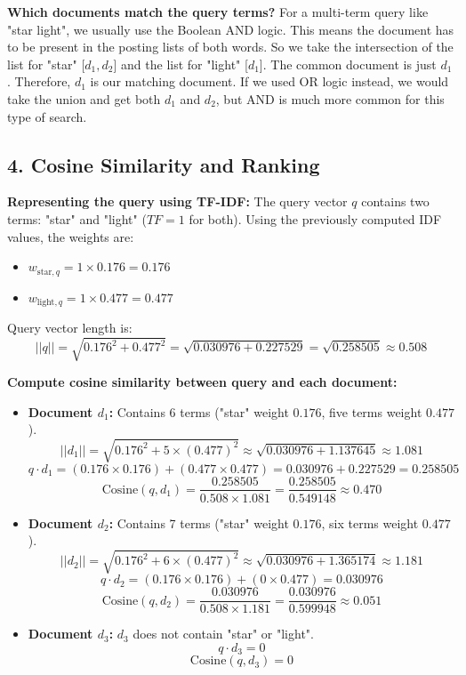 \documentclass{svproc}
\begin{document}
\textbf{Which documents match the query terms?}
For a multi-term query like "star light", we usually use the Boolean AND logic. This means the document has to be present in the posting lists of both words. So we take the intersection of the list for "star" [$d_1, d_2$] and the list for "light" [$d_1$]. The common document is just $d_1$. Therefore, $d_1$ is our matching document. If we used OR logic instead, we would take the union and get both $d_1$ and $d_2$, but AND is much more common for this type of search.

\subsection*{4. Cosine Similarity and Ranking}
\textbf{Representing the query using TF-IDF:} 
The query vector $q$ contains two terms: "star" and "light" ($TF=1$ for both).
Using the previously computed IDF values, the weights are:
\begin{itemize}
    \item $w_{\text{star}, q} = 1 \times 0.176 = 0.176$
    \item $w_{\text{light}, q} = 1 \times 0.477 = 0.477$
\end{itemize}

Query vector length is:
\[ ||q|| = \sqrt{0.176^2 + 0.477^2} = \sqrt{0.030976 + 0.227529} = \sqrt{0.258505} \approx 0.508 \]

\textbf{Compute cosine similarity between query and each document:}
\begin{itemize}
    \item \textbf{Document $d_1$:} Contains 6 terms ("star" weight $0.176$, five terms weight $0.477$).
    \[ ||d_1|| = \sqrt{0.176^2 + 5 \times (0.477)^2} \approx \sqrt{0.030976 + 1.137645} \approx 1.081 \]
    \[ q \cdot d_1 = (0.176 \times 0.176) + (0.477 \times 0.477) = 0.030976 + 0.227529 = 0.258505 \]
    \[ \text{Cosine}(q, d_1) = \frac{0.258505}{0.508 \times 1.081} = \frac{0.258505}{0.549148} \approx 0.470 \]
    
    \item \textbf{Document $d_2$:} Contains 7 terms ("star" weight $0.176$, six terms weight $0.477$).
    \[ ||d_2|| = \sqrt{0.176^2 + 6 \times (0.477)^2} \approx \sqrt{0.030976 + 1.365174} \approx 1.181 \]
    \[ q \cdot d_2 = (0.176 \times 0.176) + (0 \times 0.477) = 0.030976 \]
    \[ \text{Cosine}(q, d_2) = \frac{0.030976}{0.508 \times 1.181} = \frac{0.030976}{0.599948} \approx 0.051 \]

    \item \textbf{Document $d_3$:} $d_3$ does not contain "star" or "light".
    \[ q \cdot d_3 = 0 \]
    \[ \text{Cosine}(q, d_3) = 0 \]
\end{itemize}
\end{document}
